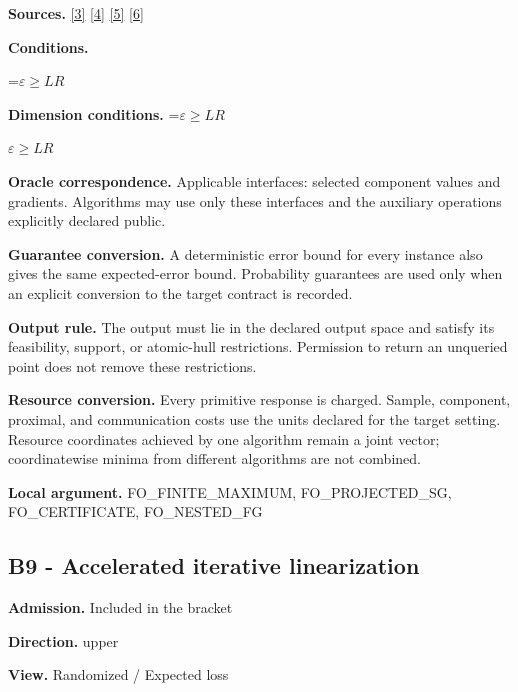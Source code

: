 \documentclass[10pt,a4paper]{article}
\newcommand{\AtlasMath}[1]{\par\begingroup\centering\setbox0=\hbox{$\displaystyle #1$}\ifdim\wd0>1.4\linewidth\typeout{ATLAS WIDE FORMULA: \the\wd0}\fi\ifdim\wd0>\linewidth\resizebox{\linewidth}{!}{\box0}\else\box0\fi\par\endgroup}
\newcommand{\AtlasInlineMath}[1]{\begingroup\setbox0=\hbox{$#1$}\ifdim\wd0>.4\linewidth\endgroup\AtlasMath{#1}\else\endgroup$#1$\fi}
\begin{document}
\textbf{Sources.} \href{https://arxiv.org/pdf/2311.10886}{[3]} \href{https://arxiv.org/pdf/1405.4980}{[4]} \href{https://www2.isye.gatech.edu/~nemirovs/MOR_AccuracyCertificates.pdf}{[5]} \href{https://arxiv.org/pdf/2609.20701}{[6]}



\textbf{Conditions.}
\AtlasMath{\varepsilon\ge LR}




\textbf{Dimension conditions.} \AtlasInlineMath{\varepsilon\ge LR}



\textbf{Oracle correspondence.} Applicable interfaces: selected component values and gradients. Algorithms may use only these interfaces and the auxiliary operations explicitly declared public.



\textbf{Guarantee conversion.} A deterministic error bound for every instance also gives the same expected-error bound. Probability guarantees are used only when an explicit conversion to the target contract is recorded.



\textbf{Output rule.} The output must lie in the declared output space and satisfy its feasibility, support, or atomic-hull restrictions. Permission to return an unqueried point does not remove these restrictions.



\textbf{Resource conversion.} Every primitive response is charged. Sample, component, proximal, and communication costs use the units declared for the target setting. Resource coordinates achieved by one algorithm remain a joint vector; coordinatewise minima from different algorithms are not combined.



\textbf{Local argument.} FO\_FINITE\_MAXIMUM, FO\_PROJECTED\_SG, FO\_CERTIFICATE, FO\_NESTED\_FG



\subsection{B9 - Accelerated iterative linearization}


\textbf{Admission.} Included in the bracket



\textbf{Direction.} upper



\textbf{View.} Randomized / Expected loss
\end{document}
